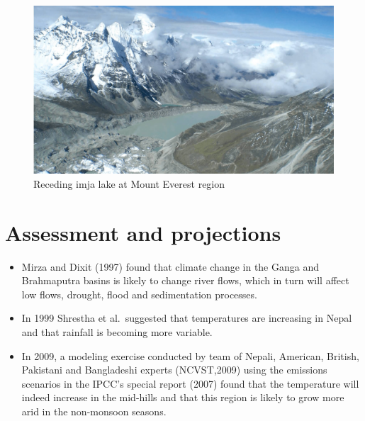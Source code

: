 \documentclass[
  ignorenonframetext,
  aspectratio=169]{beamer}
\providecommand{\tightlist}{%
  \setlength{\itemsep}{0pt}\setlength{\parskip}{0pt}}
\begin{document}
\begin{frame}{}
\protect\hypertarget{section-7}{}
\begin{figure}
\includegraphics[width=0.65\linewidth]{../images/mountain_agriculture/receding_imja_lake_everest_region} \caption{Receding imja lake at Mount Everest region}\label{fig:imja-lake-receding}
\end{figure}
\end{frame}

\hypertarget{assessment-and-projections}{%
\section{Assessment and projections}\label{assessment-and-projections}}

\begin{frame}{}
\protect\hypertarget{section-8}{}
\begin{itemize}
\tightlist
\item
  Mirza and Dixit (1997) found that climate change in the Ganga and
  Brahmaputra basins is likely to change river flows, which in turn will
  affect low flows, drought, flood and sedimentation processes.
\item
  In 1999 Shrestha et al.~suggested that temperatures are increasing in
  Nepal and that rainfall is becoming more variable.
\item
  In 2009, a modeling exercise conducted by team of Nepali, American,
  British, Pakistani and Bangladeshi experts (NCVST,2009) using the
  emissions scenarios in the IPCC's special report (2007) found that the
  temperature will indeed increase in the mid-hills and that this region
  is likely to grow more arid in the non-monsoon seasons.
\end{itemize}
\end{frame}
\end{document}
